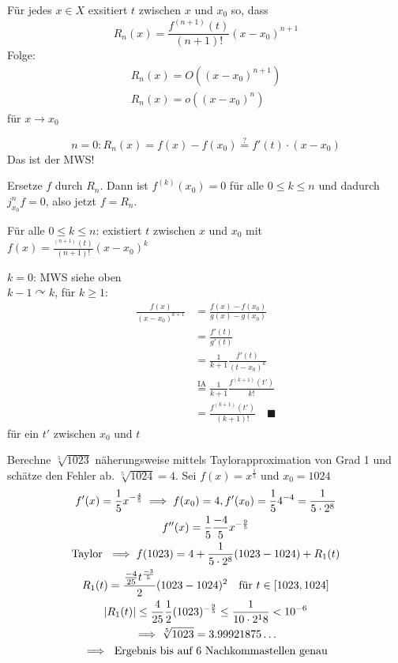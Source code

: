 \begin{satz*}[note = (Taylor)]
	Für jedes $x \in X$ exsitiert $t$ zwischen $x$ und $x_0$ so, dass
	\[ R_n(x) = \frac{f^{(n+1)}(t)}{(n+1)!} (x-x_0)^{n+1} \]
	Folge:
	\begin{gather*}
		R_n(x) = O((x-x_0)^{n+1}) \\
		R_n(x) = o((x-x_0)^n)
	\end{gather*}
	für $x \rightarrow x_0$
	
	\[ n=0 : R_n(x) = f(x) - f(x_0) \overset{?}{=} f'(t) \cdot (x-x_0) \]
	Das ist der MWS! \\
	\begin{bew}
		Ersetze $f$ durch $R_n$. Dann ist $f^{(k)}(x_0) = 0$ für alle $0 \leq k \leq n$ und dadurch $j_{x_0}^n f = 0$, also jetzt $f = R_n$.
	\end{bew}
	\begin{beh}
		Für alle $0 \leq k \leq n$: existiert $t$ zwischen $x$ und $x_0$ mit $f(x) = \frac{^{(n+1)}(t)}{(n+1)!} (x-x_0)^k$ \\
		\begin{bew}
			$k=0$: MWS siehe oben \\
			$k-1 \curvearrowright k$, für $k \geq 1$:
			\begin{align*}
				\frac{f(x)}{(x-x_0)^{k+1}}	&= \frac{f(x) - f(x_0)}{g(x) - g(x_0)} \\
									&= \frac{f'(t)}{g'(t)} \\
									&= \frac{1}{k+1} \frac{f'(t)}{(t-x_0)^k} \\
									&\overset{\text{IA}}{=} \frac{1}{k+1} \frac{f^{(k+1)}(t')}{k!} \\
									&= \frac{f^{(k+1)}(t')}{(k+1)!} \quad \blacksquare
			\end{align*}
			für ein $t'$ zwischen $x_0$ und $t$
		\end{bew}
	\end{beh}
\end{satz*}
\begin{bsp}
	Berechne $\sqrt[5]{1023}$ näherungsweise mittels Taylorapproximation von Grad 1 und schätze den Fehler ab.
	$\sqrt[5]{1024} = 4$. Sei $f(x) = x^{\frac{1}{5}}$ und $x_0 = 1024$
	\begin{gather*}
		f'(x) = \frac{1}{5} x^{-\frac{4}{5}} \implies f(x_0) = 4, f'(x_0) = \frac{1}{5} 4^{-4} = \frac{1}{5 \cdot 2^8} \\
		f''(x) = \frac{1}{5} \frac{-4}{5} x^{-\frac{9}{5}} \\
		\text{Taylor } \implies f(1023) = 4 + \frac{1}{5 \cdot 2^8} (1023 - 1024) + R_1(t) \\
		R_1(t) = \frac{\frac{-4}{25} t^{\frac{-3}{5}}}{2} (1023 - 1024)^2 \quad \text{für } t \in [1023,1024] \\
		\abs{R_1(t)} \leq \frac{4}{25} \frac{1}{2} (1023)^{-\frac{9}{5}} \leq \frac{1}{10 \cdot 2^18} < 10^{-6} \\
		\implies \sqrt[5]{1023} = 3.99921875\dots \\
		\implies \text{ Ergebnis bis auf 6 Nachkommastellen genau}
	\end{gather*}
\end{bsp}
